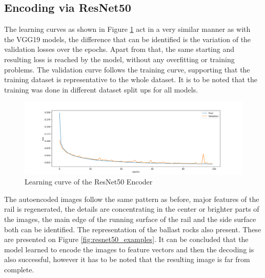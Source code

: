 \subsection{Encoding via ResNet50}
The learning curves as shown in Figure \ref{fig:resnet50_learning_curve} act in a very similar manner
as with the VGG19 models,
the difference that can be identified is the variation of the validation losses over the epochs.
Apart from that, the same starting and resulting loss is reached by the model,
without any overfitting or training problems.
The validation curve follows the training curve, supporting that the training dataset
is representative to the whole dataset.
It is to be noted that the training was done in different dataset split ups for all models.

\begin{figure}[H]
    \centering
    \includegraphics[width=\textwidth,trim={0 0 0 1cm},clip]{./results/resnet50_vgg19/20230514_213740_results.png}
    \caption{Learning curve of the ResNet50 Encoder}
    \label{fig:resnet50_learning_curve}
\end{figure}

The autoencoded images follow the same pattern as before, major features of the rail is regenerated,
the details are concentrating in the center or brighter parts of the images,
the main edge of the running surface of the rail and the side surface both can be identified.
The representation of the ballast rocks also present.
These are presented on Figure \ref{fig:resnet50_examples}.
It can be concluded that the model learned to encode the images to feature vectors and then the
decoding is also successful, however it has to be noted that the resulting image is far from complete.

